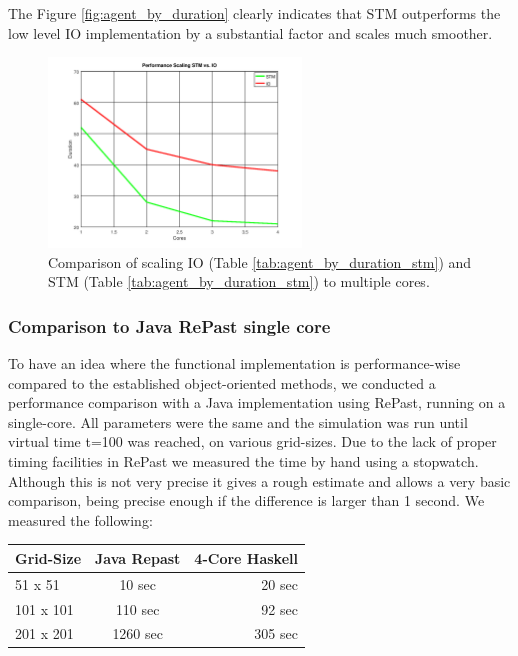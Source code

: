The Figure \ref{fig:agent_by_duration} clearly indicates that STM outperforms the low level IO implementation by a substantial factor and scales much smoother.
\begin{figure}
	\centering
	\includegraphics[width=0.6\textwidth, angle=0]{./fig/core_duration_stm_io.png}
	\caption{Comparison of scaling IO (Table \ref{tab:agent_by_duration_stm}) and STM  (Table \ref{tab:agent_by_duration_stm}) to multiple cores.}
	\label{fig:core_duration_stm_io}
\end{figure}


\subsubsection{Comparison to Java RePast single core}
To have an idea where the functional implementation is performance-wise compared to the established object-oriented methods, we conducted a performance comparison with a Java implementation using RePast, running on a single-core. All parameters were the same and the simulation was run until virtual time t=100 was reached, on various grid-sizes. Due to the lack of proper timing facilities in RePast we measured the time by hand using a stopwatch. Although this is not very precise it gives a rough estimate and allows a very basic comparison, being precise enough if the difference is larger than 1 second. We measured the following:

\begin{center}
  \begin{tabular}{ l || c | r }
    Grid-Size & Java Repast & 4-Core Haskell \\ \hline \hline 
    51 x 51 & 10 sec & 20 sec \\ \hline
    101 x 101 & 110 sec & 92 sec \\ \hline
    201 x 201 & 1260 sec & 305 sec \\ \hline
  \end{tabular}
\end{center}


